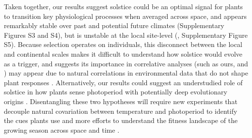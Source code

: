 \documentclass[11pt,letter]{article}
\begin{document}
Taken together, our results suggest solstice could be an optimal signal for plants to transition key physiological processes when averaged across space, and appears remarkably stable over past and potential future climates  (Supplementary Figures S3 and S4), but is unstable at the local site-level (, Supplementary Figure S5). Because selection operates on individuals, this disconnect between the local and continental scales makes it difficult to understand how solstice would evolve as a trigger, and suggests its importance in correlative analyses (such as ours, \citealp{Zohner2023} and \citealp{Journe2024}) may appear due to natural correlations in environmental data that do not shape plant responses \citep[e.g.][]{Gao2024}. Alternatively, our results could suggest an understudied role of solstice in how plants sense photoperiod with potentially deep evolutionary origins \citep{morales2024phylogenetic}. Disentangling these two hypotheses will require new experiments that decouple natural covariation between temperature and photoperiod \citep{Buonaiuto2023, Elmendorf2020} to identify the cues plants use and more efforts to understand the fitness landscape of the growing season across space and time \citep{Park2022}.









\end{document}
